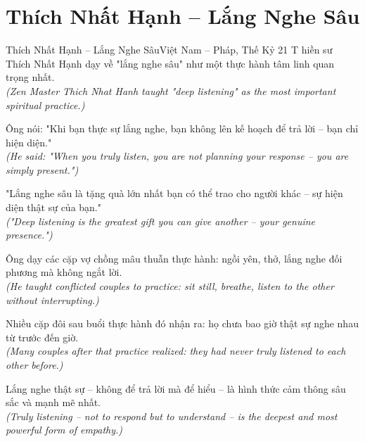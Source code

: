 \section{Thích Nhất Hạnh -- Lắng Nghe Sâu}
\begin{truyen}{Thích Nhất Hạnh -- Lắng Nghe Sâu}{Việt Nam -- Pháp, Thế Kỷ 21}
T hiền sư Thích Nhất Hạnh dạy về "lắng nghe sâu" như một thực hành tâm linh quan trọng nhất.\\
\textit{(Zen Master Thich Nhat Hanh taught "deep listening" as the most important spiritual practice.)}

Ông nói: "Khi bạn thực sự lắng nghe, bạn không lên kế hoạch để trả lời -- bạn chỉ hiện diện."\\
\textit{(He said: "When you truly listen, you are not planning your response -- you are simply present.")}

"Lắng nghe sâu là tặng quà lớn nhất bạn có thể trao cho người khác -- sự hiện diện thật sự của bạn."\\
\textit{("Deep listening is the greatest gift you can give another -- your genuine presence.")}

Ông dạy các cặp vợ chồng mâu thuẫn thực hành: ngồi yên, thở, lắng nghe đối phương mà không ngắt lời.\\
\textit{(He taught conflicted couples to practice: sit still, breathe, listen to the other without interrupting.)}

Nhiều cặp đôi sau buổi thực hành đó nhận ra: họ chưa bao giờ thật sự nghe nhau từ trước đến giờ.\\
\textit{(Many couples after that practice realized: they had never truly listened to each other before.)}

\end{truyen}
\begin{baihoc}
  Lắng nghe thật sự -- không để trả lời mà để hiểu -- là hình thức cảm thông sâu sắc và mạnh mẽ nhất.\\
  \textit{(Truly listening -- not to respond but to understand -- is the deepest and most powerful form of empathy.)}
\end{baihoc}

